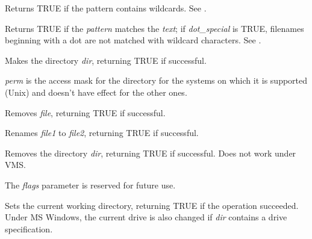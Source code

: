 \label{wxiswild}


Returns TRUE if the pattern contains wildcards. See .

\label{wxmatchwild}


Returns TRUE if the {\it pattern}\/ matches the {\it text}\/; if {\it
dot\_special}\/ is TRUE, filenames beginning with a dot are not matched
with wildcard characters. See .

\label{wxmkdir}


Makes the directory {\it dir}, returning TRUE if successful.

{\it perm} is the access mask for the directory for the systems on which it is
supported (Unix) and doesn't have effect for the other ones.

\label{wxremovefile}


Removes {\it file}, returning TRUE if successful.

\label{wxrenamefile}


Renames {\it file1} to {\it file2}, returning TRUE if successful.

\label{wxrmdir}


Removes the directory {\it dir}, returning TRUE if successful. Does not work under VMS.

The {\it flags} parameter is reserved for future use.

\label{wxsetworkingdirectory}


Sets the current working directory, returning TRUE if the operation succeeded.
Under MS Windows, the current drive is also changed if {\it dir} contains a drive specification.

